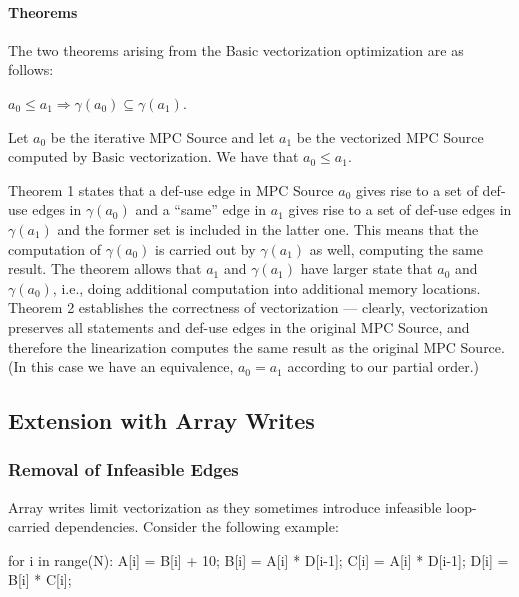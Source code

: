 \paragraph{Theorems} The two theorems arising from the Basic vectorization optimization are as follows: 

\begin{theorem} $a_0 \le a_1 \Rightarrow \gamma(a_0) \subseteq \gamma(a_1)$.
\end{theorem}

\begin{theorem} Let $a_0$ be the iterative MPC Source and let $a_1$ be the vectorized MPC Source computed by Basic vectorization. 
We have that $a_0 \le a_1$. 
\end{theorem}

Theorem 1 states that a def-use edge in MPC Source $a_0$ gives rise to a set of def-use edges in $\gamma(a_0)$
and a ``same'' edge in $a_1$ gives rise to a set of def-use edges in $\gamma(a_1)$ and the former set is included in the latter one.
This means that the computation of $\gamma(a_0)$ is carried out by $\gamma(a_1)$ as well, computing the same result. 
The theorem allows that $a_1$ and $\gamma(a_1)$ have larger state that $a_0$ and $\gamma(a_0)$, i.e., doing additional 
computation into additional memory locations. Theorem 2 establishes the correctness of vectorization --- 
clearly, vectorization preserves all statements and def-use edges in the original MPC Source, and therefore the linearization computes the 
same result as the original MPC Source. (In this case we have an equivalence, $a_0 = a_1$ according to our partial order.)

\subsection{Extension with Array Writes}
\label{sec:array_writes}

\subsubsection{Removal of Infeasible Edges}

Array writes limit vectorization as they sometimes introduce infeasible loop-carried dependencies. Consider the following example: 

{\small
\begin{pythonn}
for i in range(N):
  A[i] = B[i] + 10;
  B[i] = A[i] * D[i-1];
  C[i] = A[i] * D[i-1];
  D[i] = B[i] * C[i];
\end{pythonn}
}

